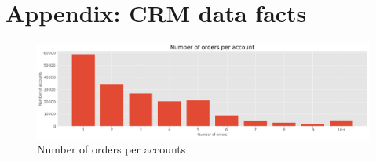 \appendix
\chapter{Appendix: CRM data facts}

\begin{figure}[h]
    \centering
    \includegraphics[width=15cm]{images/number_of_orders_per_account.png}
    \caption{Number of orders per accounts}
    \label{fig-annex:orders_per_accounts}
\end{figure}
